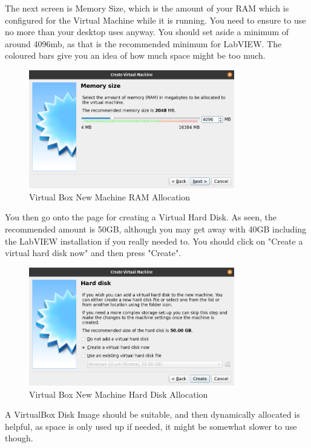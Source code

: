 \documentclass[a4paper,11pt]{report}
\begin{document}
The next screen is Memory Size, which is the amount of your RAM which is configured for the Virtual Machine while it is running. You need to ensure to use no more than your desktop uses anyway. You should set aside a minimum of around 4096mb, as that is the recommended minimum for LabVIEW. The coloured bars give you an idea of how much space might be too much.

\begin{figure}[H]
\centering
\includegraphics[width=0.8\textwidth]{screenshots/virtualboxram}
\caption{Virtual Box New Machine RAM Allocation}
\end{figure}

You then go onto the page for creating a Virtual Hard Disk. As seen, the recommended amount is 50GB, although you may get away with 40GB including the LabVIEW installation if you really needed to. You should click on "Create a virtual hard disk now" and then press "Create".

\begin{figure}[H]
\centering
\includegraphics[width=0.8\textwidth]{screenshots/virtualboxharddisk}
\caption{Virtual Box New Machine Hard Disk Allocation}
\end{figure}

A VirtualBox Disk Image should be suitable, and then dynamically allocated is helpful, as space is only used up if needed, it might be somewhat slower to use though.
\end{document}
